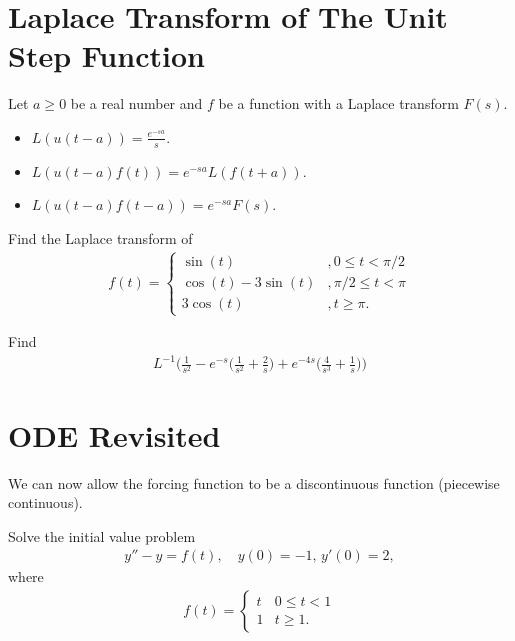 \documentclass[12pt,a4paper]{article}
\newcounter{example}[section]
\begin{document}
	
	\newpage
	
	\section{Laplace Transform of The Unit Step Function}
	Let $a \geq 0$ be a real number and $f$ be a function with a Laplace transform $F(s)$.
		\begin{itemize}
		\item $L (u (t - a)) = \displaystyle \frac{e^{-s a}}{s}$.
		\item $L (u (t- a) f(t)) = \displaystyle e^{-sa} L(f(t + a))$.
		\item $L (u(t-a) f(t-a)) = \displaystyle e^{-sa} F(s)$.
		\end{itemize}
		
	\vspace*{16pt}
	
	\begin{example}
	Find the Laplace transform of
		\begin{align*}
		f(t) = \left\{
			\begin{matrix}
			\sin (t) & , 0 \leq t < \pi / 2 \\
			\cos (t) - 3 \sin (t) & , \pi/2 \leq t < \pi \\
			3 \cos (t) & , t \geq \pi .
			\end{matrix} \right.
		\end{align*}
	\end{example}
	
	\newpage
	
	
	
	\begin{example}
	Find
		\begin{align*}
		L^{-1} \Big( \frac{1}{s^2} - e^{-s} \big( \frac{1}{s^2} + \frac{2}{s} \big) + e^{-4s} \big( \frac{4}{s^3} + \frac{1}{s} \big) \Big)
		\end{align*}
	\end{example}
	
	\newpage
	
	\section{ODE Revisited}
	We can now allow the forcing function to be a discontinuous function (piecewise continuous).
	
	\begin{example}
	Solve the initial value problem
		\begin{align*}
		y'' - y = f(t) , \quad y(0) = -1 , \, y' (0) = 2 ,
		\end{align*}
	where
		\begin{align*}
		f(t) = \left\{ 
			\begin{matrix}
			t & 0 \leq t < 1 \\
			1 & t \geq 1 .
			\end{matrix} \right.
		\end{align*}
	\end{example}
	
	\newpage
	
	\phantom{2}
	
	\newpage
	
	\phantom{2}
\end{document}
